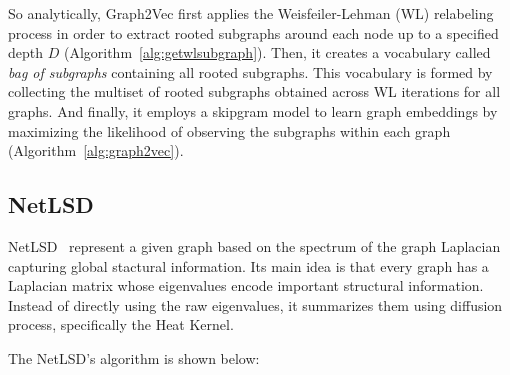 So analytically, Graph2Vec first applies the Weisfeiler-Lehman (WL) relabeling process in order to extract rooted subgraphs around each node up to a specified depth $D$ (Algorithm~\ref{alg:getwlsubgraph}).
Then, it creates a vocabulary called \textit{bag of subgraphs} containing all rooted subgraphs. This vocabulary is formed by collecting the multiset of rooted subgraphs obtained across WL iterations for all graphs.
And finally, it employs a skipgram model to learn graph embeddings by maximizing the likelihood of observing the subgraphs within each graph (Algorithm~\ref{alg:graph2vec}).


\subsection{NetLSD}
NetLSD~\cite{tsitsulin2018netlsd} represent a given graph based on the spectrum of the graph Laplacian capturing global stactural information.
Its main idea is that every graph has a Laplacian matrix whose eigenvalues encode important structural information.
Instead of directly using the raw eigenvalues, it summarizes them using diffusion process, specifically the Heat Kernel.


The NetLSD's algorithm is shown below:





